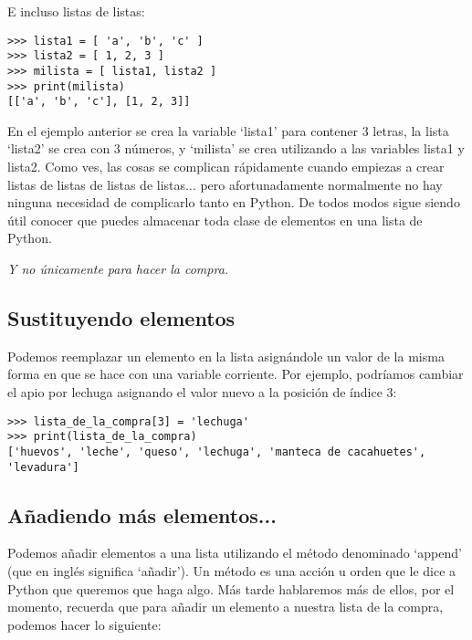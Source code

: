 \noindent
E incluso listas de listas:

\begin{listing}
\begin{verbatim}
>>> lista1 = [ 'a', 'b', 'c' ]
>>> lista2 = [ 1, 2, 3 ]
>>> milista = [ lista1, lista2 ]
>>> print(milista)
[['a', 'b', 'c'], [1, 2, 3]]
\end{verbatim}
\end{listing}

En el ejemplo anterior se crea la variable `lista1' para contener 3 letras, la lista `lista2' se crea con 3 números, y `milista' se crea utilizando a las variables lista1 y lista2. Como ves, las cosas se complican rápidamente cuando empiezas a crear listas de listas de listas de listas$\dots$ pero afortunadamente normalmente no hay ninguna necesidad de complicarlo tanto en Python. De todos modos sigue siendo útil conocer que puedes almacenar toda clase de elementos en una lista de Python. 

\noindent
\emph{Y no únicamente para hacer la compra.}

\subsection*{\color{BrickRed}Sustituyendo elementos}

Podemos reemplazar un elemento en la lista asignándole un valor de la misma forma en que se hace con una variable corriente. Por ejemplo, podríamos cambiar el apio por lechuga asignando el valor nuevo a la posición de índice 3:

\begin{listing}
\begin{verbatim}
>>> lista_de_la_compra[3] = 'lechuga'
>>> print(lista_de_la_compra)
['huevos', 'leche', 'queso', 'lechuga', 'manteca de cacahuetes', 'levadura']
\end{verbatim}
\end{listing}

\subsection*{\color{BrickRed}Añadiendo más elementos...}

Podemos añadir elementos a una lista utilizando el método denominado `append' (que en inglés significa `añadir'). Un método es una acción u orden que le dice a Python que queremos que haga algo. Más tarde hablaremos más de ellos, por el momento, recuerda que para añadir un elemento a nuestra lista de la compra, podemos hacer lo siguiente: 

